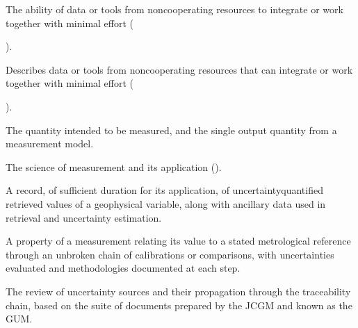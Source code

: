 \documentclass[a4paper,10pt,english]{sphinxmanual}
\begin{document}
\begin{description}
\sphinxAtStartPar
The ability of data or tools from non\sphinxhyphen{}cooperating resources to integrate
or work together with minimal effort (%
\begin{footnote}[2]\sphinxAtStartFootnote
{}
%
\end{footnote}).

\sphinxAtStartPar
Describes data or tools from non\sphinxhyphen{}cooperating resources that can integrate
or work together with minimal effort (%
\begin{footnote}[3]\sphinxAtStartFootnote
{}
%
\end{footnote}).

\sphinxAtStartPar
The quantity intended to be measured, and the single output quantity from
a measurement model.

\sphinxAtStartPar
The science of measurement and its application
({\hyperref[\detokenize{04_uncertainty_analysis:ref-jcgmvim}]{}}).

\sphinxAtStartPar
A record, of sufficient duration for its application, of
uncertainty\sphinxhyphen{}quantified retrieved values of a geophysical variable, along
with ancillary data used in retrieval and uncertainty estimation.

\sphinxAtStartPar
A property of a measurement relating its value to a stated metrological
reference through an unbroken chain of calibrations or comparisons, with
uncertainties evaluated and methodologies documented at each step.

\sphinxAtStartPar
The review of uncertainty sources and their propagation through the
traceability chain, based on the suite of documents prepared by the JCGM
and known as the GUM.

\end{description}
\end{document}
